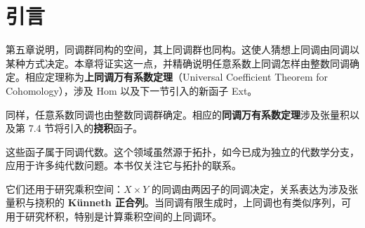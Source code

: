 \section{引言}
第五章说明，同调群同构的空间，其上同调群也同构。这使人猜想上同调由同调以某种方式决定。本章将证实这一点，并精确说明任意系数上同调怎样由整数同调确定。相应定理称为\textbf{上同调万有系数定理}（Universal Coefficient Theorem for Cohomology），涉及 Hom 以及下一节引入的新函子 Ext。

同样，任意系数同调也由整数同调群确定。相应的\textbf{同调万有系数定理}涉及张量积以及第 7.4 节将引入的\textbf{挠积}函子。

这些函子属于同调代数。这个领域虽然源于拓扑，如今已成为独立的代数学分支，应用于许多纯代数问题。本书仅关注它与拓扑的联系。

它们还用于研究乘积空间：$X\times Y$ 的同调由两因子的同调决定，关系表达为涉及张量积与挠积的 \textbf{Künneth 正合列}。当同调有限生成时，上同调也有类似序列，可用于研究杯积，特别是计算乘积空间的上同调环。
